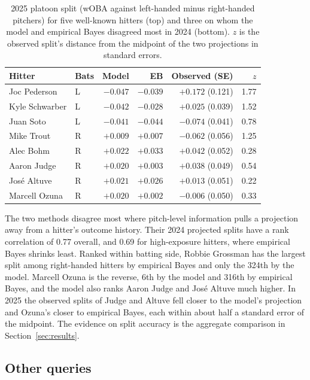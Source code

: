 \documentclass[11pt,letterpaper]{article}
\let\oldsubsection\subsection
\renewcommand\subsection{\FloatBarrier\oldsubsection}
\begin{document}
\begin{table}[!ht]
\centering\small
\begin{tabular}{llrrrr}
\toprule
Hitter & Bats & Model & EB & Observed (SE) & $z$ \\
\midrule
Joc Pederson & L & $-0.047$ & $-0.039$ & $+0.172$ (0.121) & 1.77 \\
Kyle Schwarber & L & $-0.042$ & $-0.028$ & $+0.025$ (0.039) & 1.52 \\
Juan Soto & L & $-0.041$ & $-0.044$ & $-0.074$ (0.041) & 0.78 \\
Mike Trout & R & $+0.009$ & $+0.007$ & $-0.062$ (0.056) & 1.25 \\
Alec Bohm & R & $+0.022$ & $+0.033$ & $+0.042$ (0.052) & 0.28 \\
\midrule
Aaron Judge & R & $+0.020$ & $+0.003$ & $+0.038$ (0.049) & 0.54 \\
José Altuve & R & $+0.021$ & $+0.026$ & $+0.013$ (0.051) & 0.22 \\
Marcell Ozuna & R & $+0.020$ & $+0.002$ & $-0.006$ (0.050) & 0.33 \\
\bottomrule
\end{tabular}
\caption{2025 platoon split (wOBA against left-handed minus right-handed pitchers) for five well-known hitters (top) and three on whom the model and empirical Bayes disagreed most in 2024 (bottom). $z$ is the observed split's distance from the midpoint of the two projections in standard errors.}
\label{tab:cases}
\end{table}

The two methods disagree most where pitch-level information pulls a projection away from a hitter's outcome history. Their 2024 projected splits have a rank correlation of 0.77 overall, and 0.69 for high-exposure hitters, where empirical Bayes shrinks least. Ranked within batting side, Robbie Grossman has the largest split among right-handed hitters by empirical Bayes and only the 324th by the model. Marcell Ozuna is the reverse, 6th by the model and 316th by empirical Bayes, and the model also ranks Aaron Judge and José Altuve much higher. In 2025 the observed splits of Judge and Altuve fell closer to the model's projection and Ozuna's closer to empirical Bayes, each within about half a standard error of the midpoint. The evidence on split accuracy is the aggregate comparison in Section~\ref{sec:results}.

\subsection{Other queries}
\label{sec:otherqueries}
\end{document}
